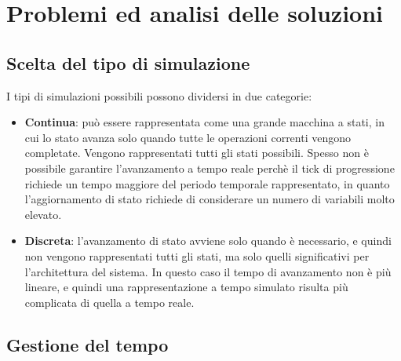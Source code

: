 \chapter{Problemi ed analisi delle soluzioni} %

\label{Chapter2} %



\section{Scelta del tipo di simulazione}

I tipi di simulazioni possibili possono dividersi in due categorie:
\begin{itemize}
 \item \textbf{Continua}: può essere rappresentata come una grande macchina a stati, in cui lo stato avanza solo quando tutte le operazioni correnti vengono completate. Vengono rappresentati tutti gli stati possibili. Spesso non è possibile garantire l'avanzamento a tempo reale perchè il tick di progressione richiede un tempo maggiore del periodo temporale rappresentato, in quanto l'aggiornamento di stato richiede di considerare un numero di variabili molto elevato.
 \item \textbf{Discreta}: l’avanzamento di stato avviene solo quando è necessario, e quindi non vengono rappresentati tutti gli stati, ma solo quelli significativi per l’architettura del sistema. In questo caso il tempo di avanzamento non è più lineare, e quindi una rappresentazione a tempo simulato risulta più complicata di quella a tempo reale.
\end{itemize}

\section{Gestione del tempo}

